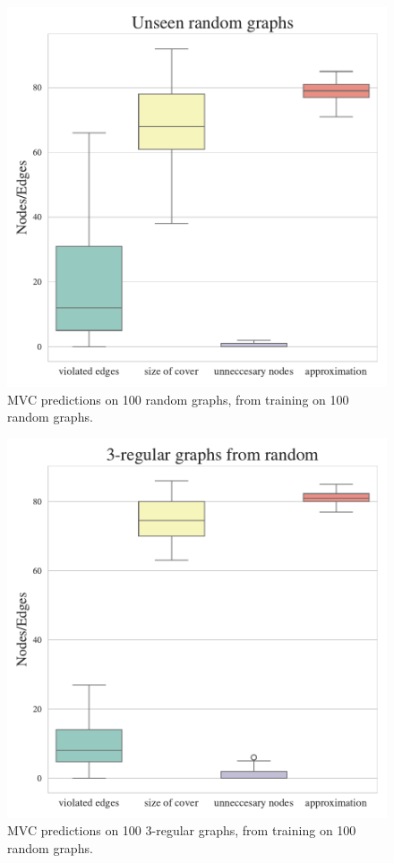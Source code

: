 \begin{figure}[h]
    \centering
    \includegraphics[width=\linewidth]{Project2TSP/_src/figures/mvc_random_to_random.pdf}
    \caption{MVC predictions on 100 random graphs, from training on 100 random graphs.}
    \label{fig:mvc_random_to_random}
\end{figure}

\begin{figure}[h]
    \centering
    \includegraphics[width=\linewidth]{Project2TSP/_src/figures/mvc_random_to_regular.pdf}
    \caption{MVC predictions on 100 $3$-regular graphs, from training on 100 random graphs.}
    \label{fig:mvc_random_to_regular}
\end{figure}

